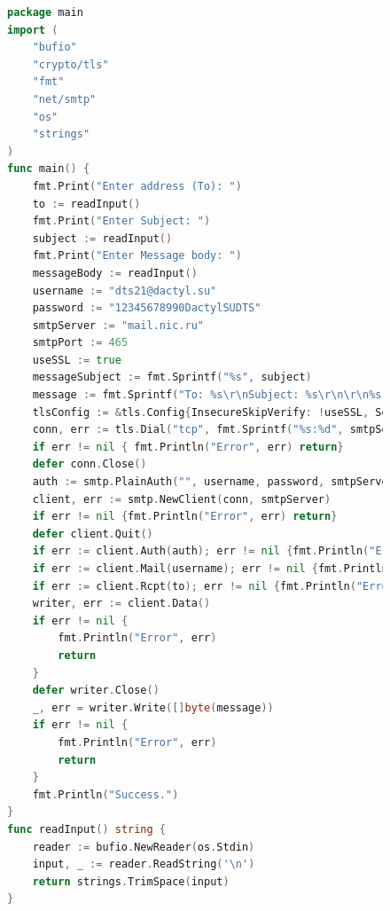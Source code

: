 \documentclass[a4paper, 14pt]{extarticle}
\begin{document}
\begin{figure}[!htb]
\begin{lstlisting}[language={Go},caption={client.go},label={lst:code1}]
package main
import (
	"bufio"
	"crypto/tls"
	"fmt"
	"net/smtp"
	"os"
	"strings"
)
func main() {
	fmt.Print("Enter address (To): ")
	to := readInput()
	fmt.Print("Enter Subject: ")
	subject := readInput()
	fmt.Print("Enter Message body: ")
	messageBody := readInput()
	username := "dts21@dactyl.su"
	password := "12345678990DactylSUDTS"
	smtpServer := "mail.nic.ru"
	smtpPort := 465
	useSSL := true
	messageSubject := fmt.Sprintf("%s", subject)
	message := fmt.Sprintf("To: %s\r\nSubject: %s\r\n\r\n%s", to, messageSubject, messageBody)
	tlsConfig := &tls.Config{InsecureSkipVerify: !useSSL, ServerName: smtpServer,}
	conn, err := tls.Dial("tcp", fmt.Sprintf("%s:%d", smtpServer, smtpPort), tlsConfig)
	if err != nil { fmt.Println("Error", err) return}
	defer conn.Close()
	auth := smtp.PlainAuth("", username, password, smtpServer)
	client, err := smtp.NewClient(conn, smtpServer)
	if err != nil {fmt.Println("Error", err) return}
	defer client.Quit()
	if err := client.Auth(auth); err != nil {fmt.Println("Error", err) return}
	if err := client.Mail(username); err != nil {fmt.Println("Error", err) return}
	if err := client.Rcpt(to); err != nil {fmt.Println("Error", err) return}
	writer, err := client.Data()
	if err != nil {
		fmt.Println("Error", err)
		return
	}
	defer writer.Close()
	_, err = writer.Write([]byte(message))
	if err != nil {
		fmt.Println("Error", err)
		return
	}
	fmt.Println("Success.")
}
func readInput() string {
	reader := bufio.NewReader(os.Stdin)
	input, _ := reader.ReadString('\n')
	return strings.TrimSpace(input)
}
\end{lstlisting}
\end{figure}

\newpage
\end{document}
